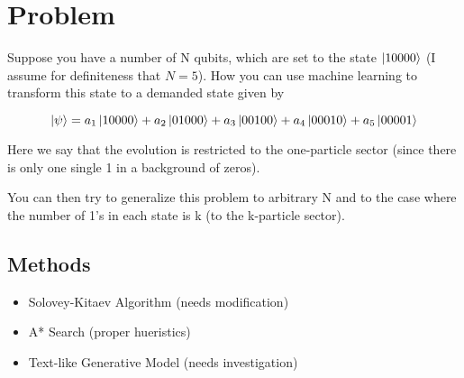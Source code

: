 \documentclass{article}
\begin{document}
\section{Problem}
Suppose you have a number of N qubits, which are set to the state $\ket{10000}$ (I assume for definiteness that $N=5$).  How you can use machine learning to transform this state to a demanded state given by

\[ \ket{\psi} = a_1\ket{10000} + a_2\ket{01000} +
  a_3\ket{00100} + a_4\ket{00010} + a_5\ket{00001} \]

Here we say that the evolution is restricted to the one-particle sector (since there is only one single 1 in a background of zeros). 

You can then try to generalize this problem to arbitrary N and to the case where the number of 1's in each state is k (to the k-particle sector). 
\subsection{Methods}
\begin{itemize}
  \item Solovey-Kitaev Algorithm (needs modification)
  \item A* Search (proper hueristics)
  \item Text-like Generative Model (needs investigation)
\end{itemize}
\end{document}
